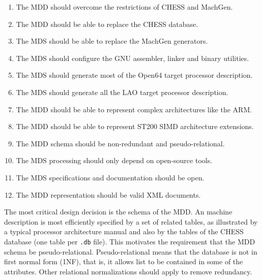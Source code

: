\documentclass[11pt,a4paper]{article}
\begin{document}
\begin{enumerate}

\item The MDD should overcome the restrictions of CHESS and MachGen.

\item The MDD should be able to replace the CHESS database.

\item The MDS should be able to replace the MachGen generators.

\item The MDS should configure the GNU assembler, linker and binary utilities.

\item The MDS should generate most of the Open64 target processor description.

\item The MDS should generate all the LAO target processor description.

\item The MDD should be able to represent complex architectures like the ARM.

\item The MDD should be able to represent ST200 SIMD architecture extensions.

\item The MDD schema should be non-redundant and pseudo-relational.

\item The MDS processing should only depend on open-source tools.

\item The MDS specifications and documentation should be open.

\item The MDD representation should be valid XML documents.

\end{enumerate}

The most critical design decision is the schema of the MDD. An machine
description is most efficiently specified by a set of related tables, as
illustrated by a typical processor architecture manual and also by the tables
of the CHESS database (one table per \texttt{.db} file). This motivates the
requirement that the MDD schema be pseudo-relational. Pseudo-relational means
that the database is not in first normal form (1NF), that is, it allows list to
be contained in some of the attributes. Other relational normalizations should
apply to remove redundancy. \medskip
\end{document}
